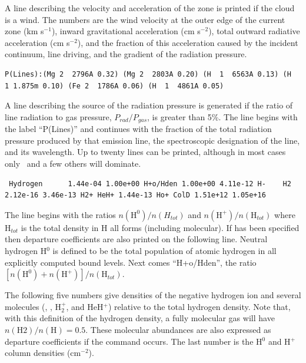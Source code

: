 A line describing the velocity and acceleration of the zone is printed
if the cloud is a wind.
The numbers are the wind velocity at the outer
edge of the current zone (km s$^{-1}$), inward gravitational acceleration (cm s$^{-2}$), total outward radiative acceleration (cm s$^{-2}$),
and the fraction of
this acceleration caused by the incident continuum, line driving, and the
gradient of the radiation pressure.
{\setverbatimfontsize{\tiny}
\begin{verbatim}
P(Lines):(Mg 2  2796A 0.32) (Mg 2  2803A 0.20) (H  1  6563A 0.13) (H  1 1.875m 0.10) (Fe 2  1786A 0.06) (H  1  4861A 0.05)
\end{verbatim}
}
A line describing the source of the radiation pressure is generated if
the ratio of line radiation to gas pressure, $P_{rad}/P_{gas}$,
is greater than 5\%.
The line begins with the label ``P(Lines)'' and
continues with the fraction
of the total radiation pressure produced by that emission line, the
spectroscopic designation of the line, and its wavelength.
Up to twenty
lines can be printed, although in most cases only \la\
and a few others will dominate.
{\setverbatimfontsize{\tiny}
\begin{verbatim}
 Hydrogen      1.44e-04 1.00e+00 H+o/Hden 1.00e+00 4.11e-12 H-    H2 2.12e-16 3.46e-13 H2+ HeH+ 1.44e-13 Ho+ ColD 1.51e+12 1.05e+16
\end{verbatim}
}

The line begins with the ratios $n(\mathrm{H}^0)/n(H_{tot})$ and
$n(\mathrm{H}^+)/n(\mathrm{H}_{tot})$ where
$\mathrm{H}_{tot}$ is the total density in H all forms (including molecular).
If \cdCommand{print h-like departure coefficients} has been specified
then departure coefficients
are also printed on the following line.
Neutral hydrogen H$^0$ is defined
to be the total population of atomic hydrogen in all explicitly computed
bound levels.
Next comes ``H+o/Hden'', the ratio
$[n(\mathrm{H}^0) + n(\mathrm{H}^+)]/n(\mathrm{H}_{tot})$.

The following five numbers give densities of the negative hydrogen ion
and several molecules (\hminus, \htwo, H$_2^+$, and HeH$^+$)
relative to the total hydrogen density.
Note that, with this definition of the hydrogen density, a fully
molecular gas will have $n(\mathrm{H}2)/n(\mathrm{H})=0.5$.
These molecular abundances are
also expressed as departure coefficients if the
command occurs.
The last number is the H$^0$ and H$^+$ column densities
(cm$^{-2}$).

